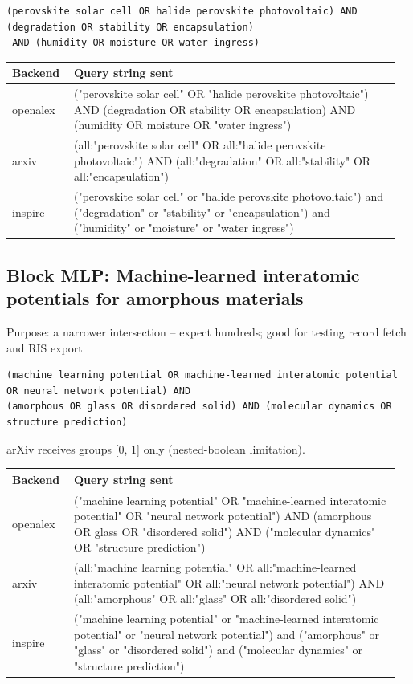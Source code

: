 \documentclass[10pt,a4paper]{article}
\begin{document}
\begin{Verbatim}[fontsize=\scriptsize]
(perovskite solar cell OR halide perovskite photovoltaic) AND (degradation OR stability OR encapsulation)
 AND (humidity OR moisture OR water ingress)
\end{Verbatim}
{\scriptsize\begin{longtable}{p{0.151\linewidth}p{0.804\linewidth}}
\hline
\textbf{Backend} & \textbf{Query string sent} \\ \hline
\endhead
openalex & ("perovskite solar cell" OR "halide perovskite photovoltaic") AND (degradation OR stability OR encapsulation) AND (humidity OR moisture OR "water ingress") \\
arxiv & (all:"perovskite solar cell" OR all:"halide perovskite photovoltaic") AND (all:"degradation" OR all:"stability" OR all:"encapsulation") \\
inspire & ("perovskite solar cell" or "halide perovskite photovoltaic") and ("degradation" or "stability" or "encapsulation") and ("humidity" or "moisture" or "water ingress") \\
\hline
\end{longtable}}
\subsection*{Block MLP: Machine-learned interatomic potentials for amorphous materials}
Purpose: a narrower intersection -- expect hundreds; good for testing record fetch and RIS export

\begin{Verbatim}[fontsize=\scriptsize]
(machine learning potential OR machine-learned interatomic potential OR neural network potential) AND 
(amorphous OR glass OR disordered solid) AND (molecular dynamics OR structure prediction)
\end{Verbatim}
arXiv receives groups {[}0, 1{]} only (nested-boolean limitation).

{\scriptsize\begin{longtable}{p{0.151\linewidth}p{0.804\linewidth}}
\hline
\textbf{Backend} & \textbf{Query string sent} \\ \hline
\endhead
openalex & ("machine learning potential" OR "machine-learned interatomic potential" OR "neural network potential") AND (amorphous OR glass OR "disordered solid") AND ("molecular dynamics" OR "structure prediction") \\
arxiv & (all:"machine learning potential" OR all:"machine-learned interatomic potential" OR all:"neural network potential") AND (all:"amorphous" OR all:"glass" OR all:"disordered solid") \\
inspire & ("machine learning potential" or "machine-learned interatomic potential" or "neural network potential") and ("amorphous" or "glass" or "disordered solid") and ("molecular dynamics" or "structure prediction") \\
\hline
\end{longtable}}
\end{document}
